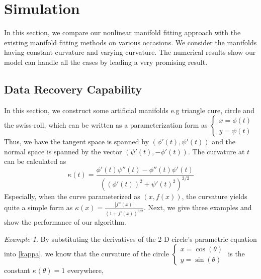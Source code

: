 \documentclass[aos,preprint]{imsart}
\theoremstyle{remark}
\newtheorem{example}{Example}
\begin{document}
\section{Simulation}
In this section, we compare our nonlinear manifold fitting approach with the existing manifold fitting methods on various occasions. We consider the manifolds having constant curvature and varying curvature. The numerical results show our model can handle all the cases by leading a very promising result.
\subsection{Data Recovery Capability}
In this section, we construct some artificial manifolds e.g triangle cure, circle and the swiss-roll, which can be written as a parameterization form as
$
\left\{
\begin{array}{c}
x = \phi(t)\\
y = \psi(t)
\end{array}
\right.
$
Thus, we have the tangent space is spanned by $(\phi'(t),\psi'(t))$ and the normal space is spanned by the vector $(\psi'(t),-\phi'(t))$. The curvature at $t$ can be calculated as
\begin{equation}\label{kappa}
\kappa(t) = \frac{\phi'(t)\psi''(t)-\phi''(t)\psi'(t)}{((\phi'(t))^2+\psi'(t)^2)^{3/2}}
\end{equation}
Especially, when the curve parameterized as $(x,f(x))$, the curvature yields quite a simple form as
$\kappa(x) = \frac{|f''(x)|}{(1+f'(x))^{3/2}}$. Next, we give three examples and show the performance of our algorithm.
\begin{example}
By substituting the derivatives of the 2-D circle's parametric equation  into \eqref{kappa}. we know that the curvature of the circle $\left\{\begin{array}{c}
x= \cos(\theta)\\
y=\sin(\theta)
\end{array}\right.$ is the constant $\kappa(\theta) = 1$ everywhere, 
\end{example}
\end{document}
